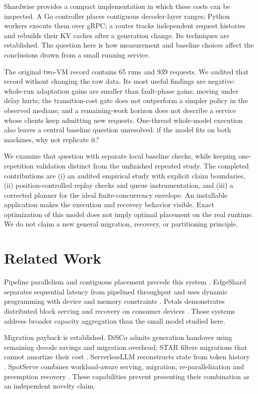 \documentclass[conference]{IEEEtran}
\begin{document}
Shardwise provides a compact implementation in which these costs can be
inspected. A Go controller places contiguous decoder-layer ranges;
Python workers execute them over gRPC; a router tracks independent
request histories and rebuilds their KV caches after a generation
change. Its techniques are established. The question here is how
measurement and baseline choices affect the conclusions drawn from a
small running service.

The original two-VM record contains 65 runs and 939 requests. We audited
that record without changing the raw data. Its most useful findings are
negative: whole-run adaptation gains are smaller than fault-phase gains;
moving under delay hurts; the transition-cost gate does not outperform a
simpler policy in the observed medians; and a remaining-work horizon
does not describe a service whose clients keep admitting new requests.
One-thread whole-model execution also leaves a central baseline question
unresolved: if the model fits on both machines, why not replicate it?

We examine that question with separate local baseline checks, while
keeping one-repetition validation distinct from the unfinished repeated
study. The completed contributions are (i) an audited empirical study
with explicit claim boundaries, (ii) position-controlled replay checks
and queue instrumentation, and (iii) a corrected planner for the ideal
finite-concurrency envelope. An installable application makes the
execution and recovery behavior visible. Exact optimization of this
model does not imply optimal placement on the real runtime. We do not
claim a new general migration, recovery, or partitioning principle.

\hypertarget{related-work}{%
\section{Related Work}\label{related-work}}

Pipeline parallelism and contiguous placement precede this system
\citep{huang2019gpipe, narayanan2019pipedream, bokhari1988partitioning}.
EdgeShard separates sequential latency from pipelined throughput and
uses dynamic programming with device and memory constraints
\citep{edgeshard2025}. Petals demonstrates distributed block serving and
recovery on consumer devices \citep{borzunov2023petals}. Those systems
address broader capacity aggregation than the small model studied here.

Migration payback is established. DiSCo admits generation handover using
remaining decode savings and migration overhead; STAR filters migrations
that cannot amortize their cost \citep{sun-etal-2025-disco, star2026}.
ServerlessLLM reconstructs state from token history
\citep{fu2024serverlessllm}. SpotServe combines workload-aware serving,
migration, re-parallelization and preemption recovery
\citep{miao2023spotserve}. These capabilities prevent presenting their
combination as an independent novelty claim.
\end{document}
